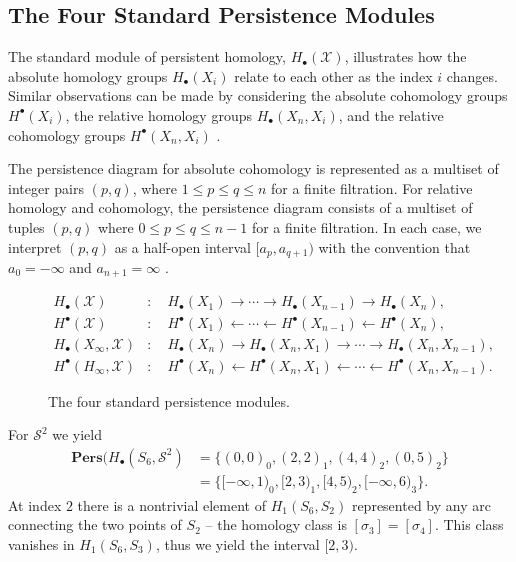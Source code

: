 \subsection{The Four Standard Persistence Modules}
\label{standardpersistencemodules} The standard module of persistent homology, $H
_{\bullet}(\mathcal{X})$, illustrates how the absolute homology groups
$H_{\bullet}(X_{i})$ relate to each other as the index $i$ changes. Similar observations
can be made by considering the absolute cohomology groups $H^{\bullet}(X_{i})$,
the relative homology groups $H_{\bullet}(X_{n}, X_{i})$, and the relative cohomology
groups $H^{\bullet}(X_{n}, X_{i})$ \cite[§2.4]{de2011dualities}.

The persistence diagram for absolute cohomology is represented as a multiset of integer
pairs $(p,q)$, where $1 \leq p \leq q \leq n$ for a finite filtration. For relative
homology and cohomology, the persistence diagram consists of a multiset of
tuples $(p,q)$ where $0 \leq p \leq q \leq n-1$ for a finite filtration. In each
case, we interpret $(p,q)$ as a half-open interval $[a_{p}, a_{q+1})$ with the
convention that $a_{0} = -\infty$ and $a_{n+1}= \infty$
\cite[§2.4]{de2011dualities}.

\begin{figure}
	\begin{align*}
		H_{\bullet}(\mathcal{X})             & : \quad H_{\bullet}(X_{1}) \rightarrow \cdots \rightarrow H_{\bullet}(X_{n-1}) \rightarrow H_{\bullet}(X_{n}),             \\
		H^{\bullet}(\mathcal{X})             & : \quad H^{\bullet}(X_{1}) \leftarrow \cdots \leftarrow H^{\bullet}(X_{n-1}) \leftarrow H^{\bullet}(X_{n}),                \\
		H_{\bullet}(X_{\infty}, \mathcal{X}) & : \quad H_{\bullet}(X_{n}) \rightarrow H_{\bullet}(X_{n},X_{1}) \rightarrow \cdots \rightarrow H_{\bullet}(X_{n},X_{n-1}), \\
		H^{\bullet}(H_{\infty}, \mathcal{X}) & : \quad H^{\bullet}(X_{n}) \leftarrow H^{\bullet}(X_{n},X_{1}) \leftarrow \cdots \leftarrow H^{\bullet}(X_{n}, X_{n-1}).
	\end{align*}
	\caption{The four standard persistence modules.}
\end{figure}

\begin{example}
	For $\mathcal{S}^{2}$ we yield
	\begin{align}
		\textbf{Pers}(H_{\bullet}(S_{6},\mathcal{S}^{2}) & = \{(0,0)_{0}, (2,2)_{1}, (4,4)_{2}, (0,5)_{2}\}               \\
		                                                 & = \{[-\infty, 1)_{0}, [2,3)_{1}, [4,5)_{2}, [-\infty,6)_{3}\}.
	\end{align}
	At index $2$ there is a nontrivial element of $H_{1}(S_{6},S_{2})$ represented
	by any arc connecting the two points of $S_{2}$ \cite[§2.4]{de2011dualities} --
	the homology class is $[\sigma_{3}] = [\sigma_{4}]$. This class vanishes in $H_{1}
	(S_{6},S_{3})$, thus we yield the interval $[2,3)$.
\end{example}

